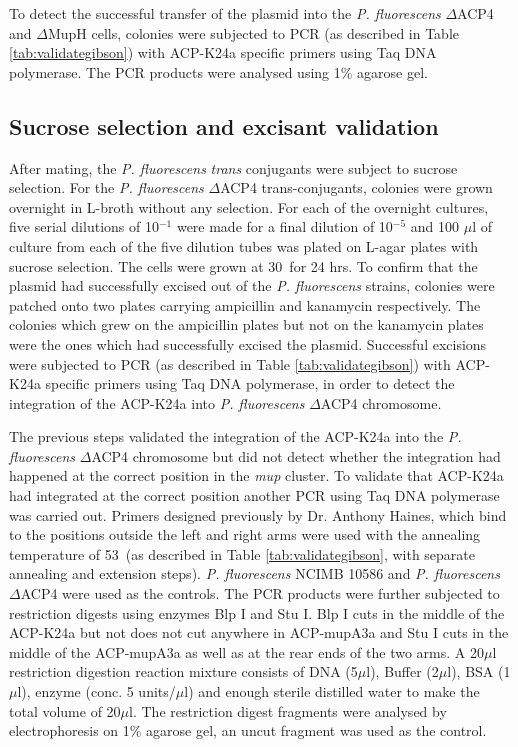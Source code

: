 		To detect the successful transfer of the plasmid into the \textit{P. fluorescens} $ \Delta $ACP4 and $ \Delta $MupH cells, colonies were subjected to PCR (as described in Table \ref{tab:validategibson}) with ACP-K24a specific primers using Taq DNA polymerase.  The PCR products were analysed using 1\% agarose gel.
			 
		\subsection{Sucrose selection and excisant validation}
		\label{sec:suc selection}
		After mating, the \textit{P. fluorescens} \textit{trans} conjugants were subject to sucrose selection. For the \textit{P. fluorescens} $ \Delta $ACP4 trans-conjugants, colonies were grown overnight in L-broth without any selection. For each of the overnight cultures, five serial dilutions of 10$ ^{-1} $ were made for a final dilution of 10$ ^{-5}$  and 100 $\mu$l of culture from each of the five dilution tubes was plated on L-agar plates with sucrose selection. The cells were grown at 30\textcelsius \ for 24 hrs. To confirm that the plasmid had successfully excised out of the \textit{P. fluorescens} strains, colonies were patched onto two plates carrying ampicillin and kanamycin respectively. The colonies which grew on the ampicillin plates but not on the kanamycin plates were the ones which had successfully excised the plasmid. Successful excisions were subjected to PCR (as described in Table \ref{tab:validategibson}) with ACP-K24a specific primers using Taq DNA polymerase, in order to detect the integration of the ACP-K24a into \textit{P. fluorescens} $ \Delta $ACP4 chromosome.

		The previous steps validated the integration of the ACP-K24a into the \textit{P. fluorescens} $ \Delta $ACP4 chromosome but did not detect whether the integration had happened at the correct position in the \textit{mup} cluster. To validate that ACP-K24a had integrated at the correct position another PCR using Taq DNA polymerase was carried out. Primers designed previously by Dr. Anthony Haines, which bind to the positions outside the left and right arms were used with the annealing temperature of 53\textcelsius \ (as described in Table \ref{tab:validategibson}, with separate annealing and extension steps). \textit{P. fluorescens} NCIMB 10586 and \textit{P. fluorescens} $ \Delta $ACP4 were used as the controls. The PCR products were further subjected to restriction digests using enzymes Blp I and Stu I. Blp I cuts in the middle of the ACP-K24a but not does not cut anywhere in ACP-mupA3a and Stu I cuts in the middle of the ACP-mupA3a as well as at the rear ends of the two arms. A 20$\mu$l restriction digestion reaction mixture consists of DNA (5$\mu$l), Buffer (2$\mu$l), BSA (1$\mu$l), enzyme (conc. 5 units/$\mu$l) and enough sterile distilled water to make the total volume of 20$\mu$l. The restriction digest fragments were analysed by electrophoresis on 1\% agarose gel, an uncut fragment was used as the control. 
		
